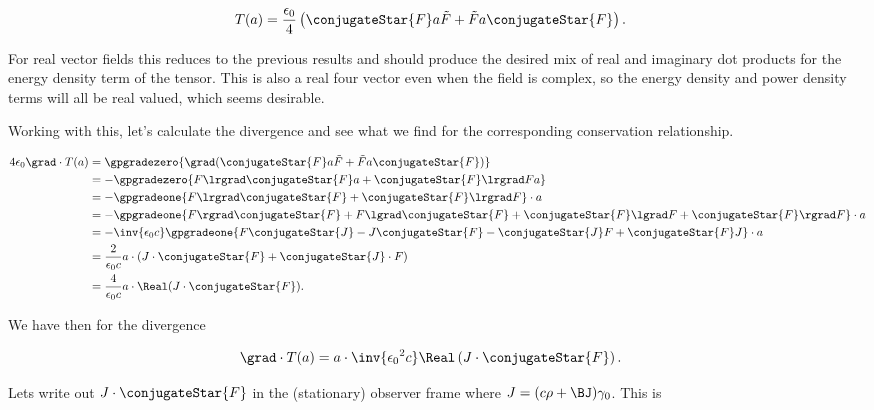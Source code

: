 \begin{align}\label{eqn:complexFieldEnergy:9}
T(a) &= \frac{\epsilon_0}{4} \left( \conjugateStar{F} a \tilde{F} + \tilde{F} a \conjugateStar{F} \right).
\end{align}

For real vector fields this reduces to the previous results and should produce the desired mix of real and imaginary dot products for the energy density term of the tensor.  This is also a real four vector even when the field is complex, so the energy density and power density terms will all be real valued, which seems desirable.

Working with this, let's calculate the divergence and see what we find for the corresponding conservation relationship.

\begin{align*}
4 \epsilon_0 \grad \cdot T(a) 
&=
\gpgradezero{ \grad ( \conjugateStar{F} a \tilde{F} + \tilde{F} a \conjugateStar{F} )} \\
&=
-\gpgradezero{ F \lrgrad \conjugateStar{F} a + \conjugateStar{F} \lrgrad F a } \\
&=
-\gpgradeone{ F \lrgrad \conjugateStar{F} + \conjugateStar{F} \lrgrad F } \cdot a \\
&=
-\gpgradeone{ 
F \rgrad \conjugateStar{F} 
+F \lgrad \conjugateStar{F} 
+ \conjugateStar{F} \lgrad F
+ \conjugateStar{F} \rgrad F
} \cdot a \\
&=
-\inv{\epsilon_0 c} \gpgradeone{ 
F \conjugateStar{J} 
- J \conjugateStar{F} 
- \conjugateStar{J} F
+ \conjugateStar{F} J
} \cdot a \\
&= \frac{2}{\epsilon_0 c} a \cdot ( 
J \cdot \conjugateStar{F} 
+ \conjugateStar{J} \cdot F
) \\
&= \frac{4}{\epsilon_0 c} a \cdot \Real ( J \cdot \conjugateStar{F} ).
\end{align*}

We have then for the divergence

\begin{align}\label{eqn:complexFieldEnergy:10}
\grad \cdot T(a) 
&= a \cdot \inv{ {\epsilon_0}^2 c } \Real \left( J \cdot \conjugateStar{F} \right).
\end{align}

Lets write out $J \cdot \conjugateStar{F}$ in the (stationary) observer frame where $J = (c\rho + \BJ) \gamma_0$.  This is

